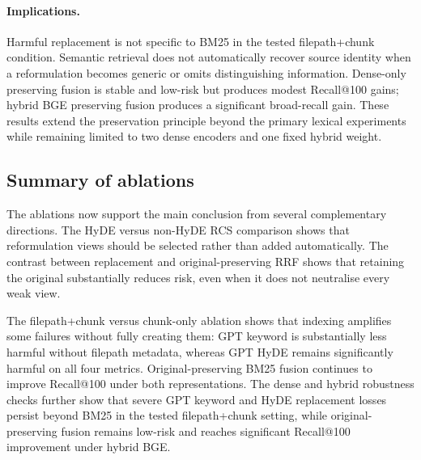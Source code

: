 \documentclass[a4paper,fleqn]{cas-dc}
\begin{document}
\paragraph{Implications.}
Harmful replacement is not specific to BM25 in the tested
filepath+chunk condition. Semantic retrieval does not
automatically recover source identity when a reformulation becomes
generic or omits distinguishing information. Dense-only preserving
fusion is stable and low-risk but produces modest Recall@100 gains;
hybrid BGE preserving fusion produces a significant broad-recall
gain. These results extend the preservation principle beyond the
primary lexical experiments while remaining limited to two dense
encoders and one fixed hybrid weight.

\subsection{Summary of ablations}
\label{sec:ablation-summary}
The ablations now support the main conclusion from several
complementary directions. The HyDE versus non-HyDE RCS
comparison shows that reformulation views should be selected
rather than added automatically. The contrast between replacement
and original-preserving RRF shows that retaining the original
substantially reduces risk, even when it does not neutralise every
weak view.

The filepath+chunk versus chunk-only ablation shows that indexing
amplifies some failures without fully creating them: GPT keyword
is substantially less harmful without filepath metadata, whereas
GPT HyDE remains significantly harmful on all four metrics.
Original-preserving BM25 fusion continues to improve Recall@100
under both representations. The dense and hybrid robustness checks
further show that severe GPT keyword and HyDE replacement losses
persist beyond BM25 in the tested filepath+chunk setting, while
original-preserving fusion remains low-risk and reaches significant
Recall@100 improvement under hybrid BGE.
\end{document}
